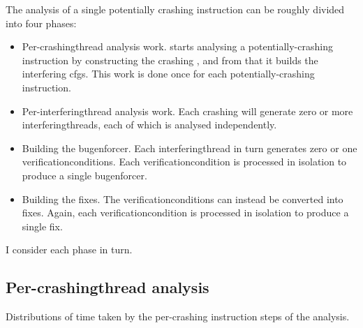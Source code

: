 The analysis of a single potentially crashing instruction can be
roughly divided into four phases:
\begin{itemize}
\item Per-\gls{crashingthread} analysis work.  {\Technique} starts
  analysing a potentially-crashing instruction by constructing the
  crashing {\StateMachine}, and from that it builds the interfering
  \glspl{cfg}.  This work is done once for each potentially-crashing
  instruction.
\item Per-\gls{interferingthread} analysis work.  Each crashing
  {\StateMachine} will generate zero or more
  \glspl{interferingthread}, each of which is analysed independently.
\item Building the \gls{bugenforcer}.  Each \gls{interferingthread} in
  turn generates zero or one \glspl{verificationcondition}.  Each
  \gls{verificationcondition} is processed in isolation to produce a
  single \gls{bugenforcer}.
\item Building the fixes.  The \glspl{verificationcondition} can
  instead be converted into fixes.  Again, each
  \gls{verificationcondition} is processed in isolation to produce a
  single fix.
\end{itemize}
I consider each phase in turn.

\subsection{Per-\gls{crashingthread} analysis}

\begin{sanefig}
  \caption{Distributions of time taken by the per-crashing instruction
    steps of the analysis.}
  \label{fig:eval:how:per_crashing_times}
\end{sanefig}

